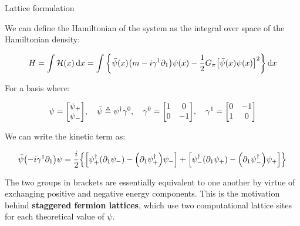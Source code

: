 \documentclass[9pt, handout, aspectratio=169]{beamer}	%
\begin{document}
\begin{frame}[allowframebreaks]{Lattice formulation}

	We can define the Hamiltonian of the system as the integral over space of the Hamiltonian density:

	\begin{gather*}
	  H = \int \mathcal{H}(x) \dd{x}
	    = \int \qty{\bar{\psi}(x)\qty(m-i\gamma^{1}\partial_{1})\psi(x) -
	                \frac{1}{2}G_{\pi}\qty[\bar{\psi}(x)\psi(x)]^{2}} \dd{x}
	\end{gather*}

	For a basis where:

	\begin{gather*}
		\psi = \mqty[\psi_{+} \\ \psi_{-}] \qc
	  \bar{\psi} \defeq \psi^{\dagger}\gamma^{0} \qc
		\gamma^{0} = \mqty[1 & 0\\ 0 & -1] \qc
	  \gamma^{1} = \mqty[0 & -1\\ 1 & 0]
	\end{gather*}

	We can write the kinetic term as:

	\begin{gather*}
	  \bar{\psi}\qty(-i\gamma^{1}\partial_{1})\psi =
			\frac{i}{2} \qty{
	      \qty[ \psi^{\dagger}_{+} \qty(\partial_{1}\psi_{-}) -
	      \qty(\partial_{1}\psi^{\dagger}_{+}) \psi_{-} ] +
	      \qty[ \psi^{\dagger}_{-} \qty(\partial_{1}\psi_{+}) -
	      \qty(\partial_{1}\psi^{\dagger}_{-}) \psi_{+} ]
	    }
	\end{gather*}

\break

	The two groups in brackets are essentially equivalent to one another by virtue of exchanging positive and negative energy components. This is the motivation behind \textbf{staggered fermion lattices}, which use two computational lattice sites for each theoretical value of $\psi$.


\end{frame}
\end{document}
